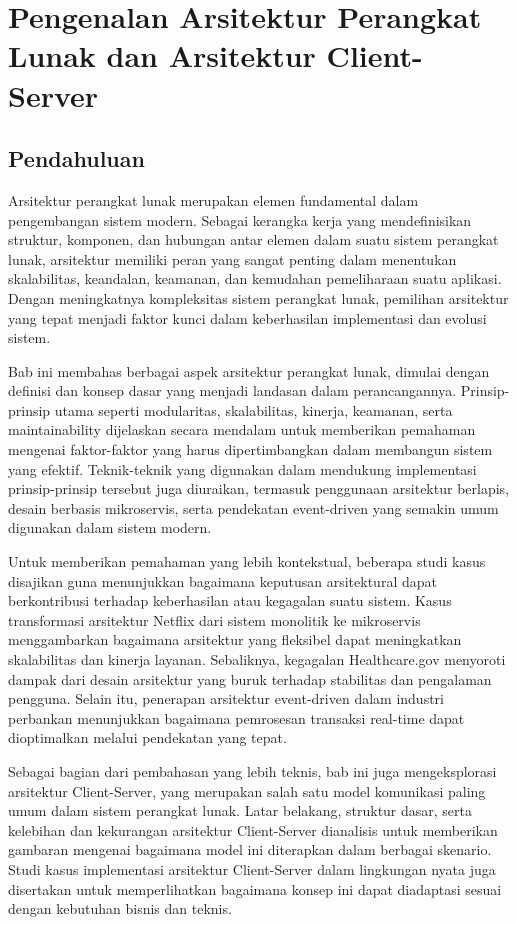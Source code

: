\chapter{Pengenalan Arsitektur Perangkat Lunak dan Arsitektur Client-Server}


\section{Pendahuluan}

Arsitektur perangkat lunak merupakan elemen fundamental dalam pengembangan sistem modern. Sebagai kerangka kerja yang mendefinisikan struktur, komponen, dan hubungan antar elemen dalam suatu sistem perangkat lunak, arsitektur memiliki peran yang sangat penting dalam menentukan skalabilitas, keandalan, keamanan, dan kemudahan pemeliharaan suatu aplikasi. Dengan meningkatnya kompleksitas sistem perangkat lunak, pemilihan arsitektur yang tepat menjadi faktor kunci dalam keberhasilan implementasi dan evolusi sistem.

Bab ini membahas berbagai aspek arsitektur perangkat lunak, dimulai dengan definisi dan konsep dasar yang menjadi landasan dalam perancangannya. Prinsip-prinsip utama seperti modularitas, skalabilitas, kinerja, keamanan, serta maintainability dijelaskan secara mendalam untuk memberikan pemahaman mengenai faktor-faktor yang harus dipertimbangkan dalam membangun sistem yang efektif. Teknik-teknik yang digunakan dalam mendukung implementasi prinsip-prinsip tersebut juga diuraikan, termasuk penggunaan arsitektur berlapis, desain berbasis mikroservis, serta pendekatan event-driven yang semakin umum digunakan dalam sistem modern.

Untuk memberikan pemahaman yang lebih kontekstual, beberapa studi kasus disajikan guna menunjukkan bagaimana keputusan arsitektural dapat berkontribusi terhadap keberhasilan atau kegagalan suatu sistem. Kasus transformasi arsitektur Netflix dari sistem monolitik ke mikroservis menggambarkan bagaimana arsitektur yang fleksibel dapat meningkatkan skalabilitas dan kinerja layanan. Sebaliknya, kegagalan Healthcare.gov menyoroti dampak dari desain arsitektur yang buruk terhadap stabilitas dan pengalaman pengguna. Selain itu, penerapan arsitektur event-driven dalam industri perbankan menunjukkan bagaimana pemrosesan transaksi real-time dapat dioptimalkan melalui pendekatan yang tepat.

Sebagai bagian dari pembahasan yang lebih teknis, bab ini juga mengeksplorasi arsitektur Client-Server, yang merupakan salah satu model komunikasi paling umum dalam sistem perangkat lunak. Latar belakang, struktur dasar, serta kelebihan dan kekurangan arsitektur Client-Server dianalisis untuk memberikan gambaran mengenai bagaimana model ini diterapkan dalam berbagai skenario. Studi kasus implementasi arsitektur Client-Server dalam lingkungan nyata juga disertakan untuk memperlihatkan bagaimana konsep ini dapat diadaptasi sesuai dengan kebutuhan bisnis dan teknis.

